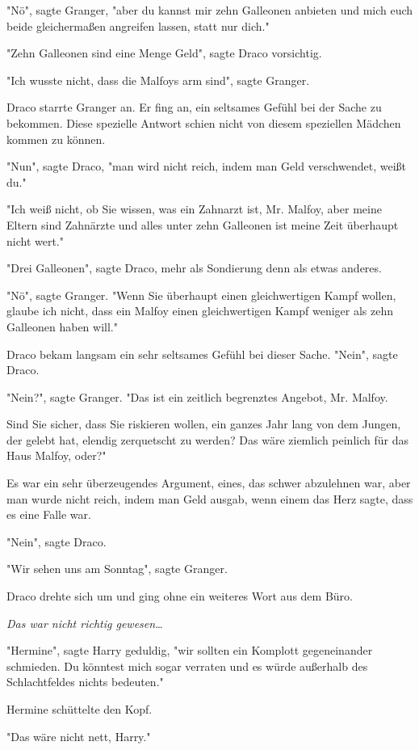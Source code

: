 {"Nö", sagte Granger, "aber du kannst mir zehn Galleonen anbieten und mich euch beide gleichermaßen angreifen lassen, statt nur dich."

"Zehn Galleonen sind eine Menge Geld", sagte Draco vorsichtig.

"Ich wusste nicht, dass die Malfoys arm sind", sagte Granger.

Draco starrte Granger an. Er fing an, ein seltsames Gefühl bei der Sache zu bekommen. Diese spezielle Antwort schien nicht von diesem speziellen Mädchen kommen zu können.

"Nun", sagte Draco, "man wird nicht reich, indem man Geld verschwendet, weißt du."

"Ich weiß nicht, ob Sie wissen, was ein Zahnarzt ist, Mr. Malfoy, aber meine Eltern sind Zahnärzte und alles unter zehn Galleonen ist meine Zeit überhaupt nicht wert."

"Drei Galleonen", sagte Draco, mehr als Sondierung denn als etwas anderes.

"Nö", sagte Granger. "Wenn Sie überhaupt einen gleichwertigen Kampf wollen, glaube ich nicht, dass ein Malfoy einen gleichwertigen Kampf weniger als zehn Galleonen haben will."

Draco bekam langsam ein sehr seltsames Gefühl bei dieser Sache. "Nein", sagte Draco.

"Nein?", sagte Granger. "Das ist ein zeitlich begrenztes Angebot, Mr. Malfoy.

Sind Sie sicher, dass Sie riskieren wollen, ein ganzes Jahr lang von dem Jungen, der gelebt hat, elendig zerquetscht zu werden? Das wäre ziemlich peinlich für das Haus Malfoy, oder?"

Es war ein sehr überzeugendes Argument, eines, das schwer abzulehnen war, aber man wurde nicht reich, indem man Geld ausgab, wenn einem das Herz sagte, dass es eine Falle war.

"Nein", sagte Draco.

"Wir sehen uns am Sonntag", sagte Granger.

Draco drehte sich um und ging ohne ein weiteres Wort aus dem Büro.

\emph{Das war nicht richtig gewesen…}

"Hermine", sagte Harry geduldig, "wir sollten ein Komplott gegeneinander schmieden. Du könntest mich sogar verraten und es würde außerhalb des Schlachtfeldes nichts bedeuten."

Hermine schüttelte den Kopf.

"Das wäre nicht nett, Harry."

}
